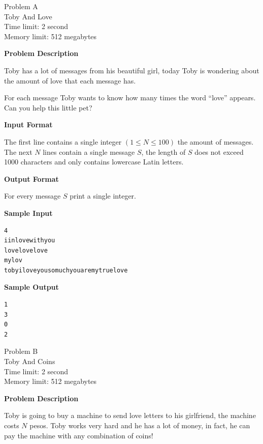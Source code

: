 \documentclass[11pt]{article}
\begin{document}
        \setcounter{page}{1}

        
        
        \begin{center}
            {\LARGE Problem A}\\
            {\Large Toby And Love}\\
            {Time limit: 2 second}\\
            {Memory limit: 512 megabytes}
        \end{center}\textbf{\large Problem Description}

Toby has a lot of messages from his beautiful girl, today Toby is wondering about
the amount of love that each message has.

For each message Toby wants to know how many times the word ``love'' appears.
Can you help this little pet?

\textbf{\large Input Format}

The first line contains a single integer $(1 \le N \le 100)$ the amount of messages.
The next $N$ lines contain a single message $S$, the length of $S$ does not exceed 1000 characters
and only contains lowercase Latin letters.

\textbf{\large Output Format}

For every message $S$ print a single integer.

\textbf{\large Sample Input}

\begin{verbatim}
4
iinlovewithyou
lovelovelove
mylov
tobyiloveyousomuchyouaremytruelove
\end{verbatim}

\textbf{\large Sample Output}

\begin{verbatim}
1
3
0
2
\end{verbatim}

\newpage

        \begin{center}
            {\LARGE Problem B}\\
            {\Large Toby And Coins}\\
            {Time limit: 2 second}\\
            {Memory limit: 512 megabytes}
        \end{center}\textbf{\large Problem Description}

Toby is going to buy a machine to send love letters to his girlfriend, the machine
costs $N$ pesos. Toby works very hard and he has a lot of money, in fact, he can
pay the machine with any combination of coins!
\end{document}
